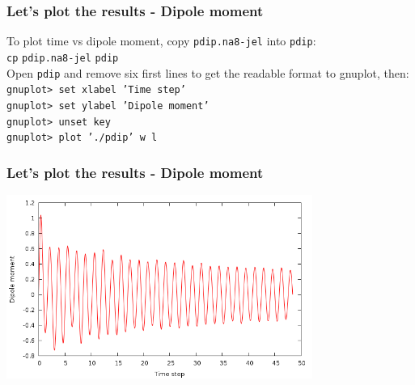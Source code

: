 \documentclass[10pt]{beamer}
\begin{document}
\begin{frame}
\frametitle{Let's plot the results - Dipole moment}
To plot time vs dipole moment, copy {\tt pdip.na8-jel} into {\tt pdip}:\\
\vspace*{0.2cm}
{\tt cp} {\tt pdip.na8-jel} {\tt pdip}\\
\vspace*{0.2cm}
Open {\tt pdip} and remove six first lines to get the readable format to gnuplot, then:\\
\vspace*{0.2cm}
{\tt gnuplot> set xlabel 'Time step'\\
gnuplot> set ylabel 'Dipole moment'\\
gnuplot> unset key \\
gnuplot> plot './pdip'  w l}\\


   
\end{frame}




\begin{frame}
\frametitle{Let's plot the results - Dipole moment}

\centering
 \includegraphics[width=10cm]{fig/dipole}

   
\end{frame}

\end{document}
